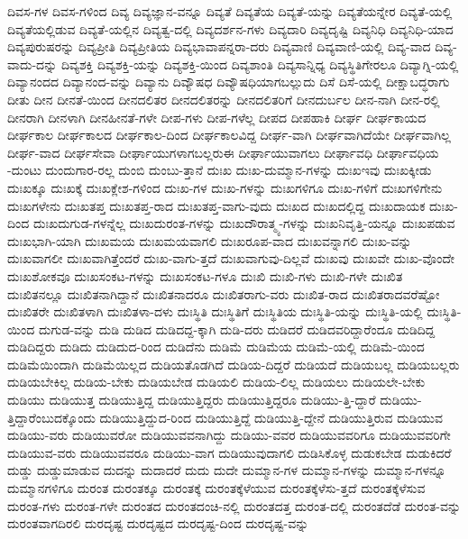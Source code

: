 {ದಿವಸ-ಗಳ
ದಿವಸ-ಗಳಿಂದ
ದಿವ್ಯ
ದಿವ್ಯಜ್ಞಾನ-ವನ್ನೂ
ದಿವ್ಯತೆ
ದಿವ್ಯತೆಯ
ದಿವ್ಯತೆ-ಯನ್ನು
ದಿವ್ಯತೆಯನ್ನೇರ
ದಿವ್ಯತೆ-ಯಲ್ಲಿ
ದಿವ್ಯತೆಯಲ್ಲಿಡುವ
ದಿವ್ಯತೆ-ಯಲ್ಲಿನ
ದಿವ್ಯತ್ವ-ದಲ್ಲಿ
ದಿವ್ಯದರ್ಶನ-ಗಳು
ದಿವ್ಯದಾರಿ
ದಿವ್ಯದೃಷ್ಟಿ
ದಿವ್ಯನಿಧಿ
ದಿವ್ಯನಿಧಿ-ಯಾದ
ದಿವ್ಯಪುರುಷರನ್ನು
ದಿವ್ಯಪ್ರೀತಿ
ದಿವ್ಯಪ್ರೀತಿಯ
ದಿವ್ಯಭಾವಾಪನ್ನರಾ-ದರು
ದಿವ್ಯವಾಣಿ
ದಿವ್ಯವಾಣಿ-ಯಲ್ಲಿ
ದಿವ್ಯ-ವಾದ
ದಿವ್ಯ-ವಾದು-ದನ್ನು
ದಿವ್ಯಶಕ್ತಿ
ದಿವ್ಯಶಕ್ತಿ-ಯನ್ನು
ದಿವ್ಯಶಕ್ತಿ-ಯಿಂದ
ದಿವ್ಯಶಾಂತಿ
ದಿವ್ಯಸಾನ್ನಿಧ್ಯ
ದಿವ್ಯಸ್ಥಿತಿಗೇರಲೂ
ದಿವ್ಯಾಗ್ನಿ-ಯಲ್ಲಿ
ದಿವ್ಯಾನಂದದ
ದಿವ್ಯಾನಂದ-ವನ್ನು
ದಿವ್ಯಾನು
ದಿವ್ಯೌಷಧ
ದಿವ್ಯೌಷಧಿಯಾಗಬಲ್ಲುದು
ದಿಸೆ
ದಿಸೆ-ಯಲ್ಲಿ
ದೀಕ್ಷಾಬದ್ಧರಾಗು
ದೀತು
ದೀನ
ದೀನತೆ-ಯಿಂದ
ದೀನದಲಿತರ
ದೀನದಲಿತರನ್ನು
ದೀನದಲಿತರಿಗೆ
ದೀನದುರ್ಬಲ
ದೀನ-ನಾಗಿ
ದೀನ-ರಲ್ಲಿ
ದೀನರಾಗಿ
ದೀನಳಾಗಿ
ದೀನಹೀನತೆ-ಗಳೇ
ದೀಪ-ಗಳು
ದೀಪ-ಗಳೆಲ್ಲ
ದೀಪದ
ದೀಪಹಾಕಿ
ದೀರ್ಘ
ದೀರ್ಘಕಾಯದ
ದೀರ್ಘಕಾಲ
ದೀರ್ಘಕಾಲದ
ದೀರ್ಘಕಾಲ-ದಿಂದ
ದೀರ್ಘಕಾಲವಿದ್ದ
ದೀರ್ಘ-ವಾಗಿ
ದೀರ್ಘವಾಗಿದೆಯೇ
ದೀರ್ಘವಾಗಿಲ್ಲ
ದೀರ್ಘ-ವಾದ
ದೀರ್ಘಸೇವಾ
ದೀರ್ಘಾಯುಗಳಾಗಬಲ್ಲರುಈ
ದೀರ್ಘಾಯುವಾಗಲು
ದೀರ್ಘಾವಧಿ
ದೀರ್ಘಾವಧಿಯ
-ದುಂಟು
ದುಂದುಗಾರ-ರಲ್ಲ
ದುಂಬಿ
ದುಂಬು-ತ್ತಾನೆ
ದುಃಖ
ದುಃಖ-ದುಮ್ಮಾನ-ಗಳನ್ನು
ದುಃಖಇವು
ದುಃಖಕ್ಕೀಡು
ದುಃಖಕ್ಕೂ
ದುಃಖಕ್ಕೆ
ದುಃಖಕ್ಲೇಶ-ಗಳಿಂದ
ದುಃಖ-ಗಳ
ದುಃಖ-ಗಳನ್ನು
ದುಃಖಗಳಿಗೂ
ದುಃಖ-ಗಳಿಗೆ
ದುಃಖಗಳಿಗೇನು
ದುಃಖಗಳೇನು
ದುಃಖತಪ್ತ
ದುಃಖತಪ್ತ-ರಾದ
ದುಃಖತಪ್ತ-ವಾಗು-ವುದು
ದುಃಖದ
ದುಃಖದಲ್ಲಿದ್ದ
ದುಃಖದಾಯಕ
ದುಃಖ-ದಿಂದ
ದುಃಖದುಗುಡ-ಗಳನ್ನೆಲ್ಲ
ದುಃಖದುರಂತ-ಗಳನ್ನು
ದುಃಖದೌರಾತ್ಮ್ಯ-ಗಳನ್ನು
ದುಃಖನಿವೃತ್ತಿ-ಯನ್ನೂ
ದುಃಖಪಡುವ
ದುಃಖಭಾಗಿ-ಯಾಗಿ
ದುಃಖಮಯ
ದುಃಖಮಯವಾಗಲಿ
ದುಃಖರೂಪ-ವಾದ
ದುಃಖವನ್ನಾಗಲಿ
ದುಃಖ-ವನ್ನು
ದುಃಖವಾಗಲೀ
ದುಃಖವಾಗಿತ್ತೆಂದರೆ
ದುಃಖ-ವಾಗು-ತ್ತದೆ
ದುಃಖವಾಗುವು-ದಿಲ್ಲವೆ
ದುಃಖವು
ದುಃಖವೇ
ದುಃಖ-ವೊಂದೇ
ದುಃಖಶೋಕವೂ
ದುಃಖಸಂಕಟ-ಗಳನ್ನು
ದುಃಖಸಂಕಟ-ಗಳೂ
ದುಃಖಿ
ದುಃಖಿ-ಗಳು
ದುಃಖಿ-ಗಳೇ
ದುಃಖಿತ
ದುಃಖಿತನಲ್ಲೂ
ದುಃಖಿತನಾಗಿದ್ದಾನೆ
ದುಃಖಿತನಾದರೂ
ದುಃಖಿತರಾಗು-ವರು
ದುಃಖಿತ-ರಾದ
ದುಃಖಿತರಾದವರೆಷ್ಟೋ
ದುಃಖಿತರೇ
ದುಃಖಿತಳಾಗಿ
ದುಃಖಿತಳಾ-ದಳು
ದುಃಸ್ಥಿತಿ
ದುಃಸ್ಥಿತಿಗೆ
ದುಃಸ್ಥಿತಿಯ
ದುಃಸ್ಥಿತಿ-ಯನ್ನು
ದುಃಸ್ಥಿತಿ-ಯಲ್ಲಿ
ದುಃಸ್ಥಿತಿ-ಯಿಂದ
ದುಗುಡ-ವನ್ನು
ದುಡಿ
ದುಡಿದ
ದುಡಿದದ್ದ-ಕ್ಕಾಗಿ
ದುಡಿ-ದರು
ದುಡಿದರೆ
ದುಡಿದವರಿದ್ದಾರೆಂದೂ
ದುಡಿದಿದ್ದ
ದುಡಿದಿದ್ದರು
ದುಡಿದು
ದುಡಿದುದ-ರಿಂದ
ದುಡಿದೆನು
ದುಡಿಮೆ
ದುಡಿಮೆಯ
ದುಡಿಮೆ-ಯಲ್ಲಿ
ದುಡಿಮೆ-ಯಿಂದ
ದುಡಿಮೆಯಿಂದಾಗಿ
ದುಡಿಮೆಯಿಲ್ಲದ
ದುಡಿಯತೊಡಗಿದೆ
ದುಡಿಯ-ದಿದ್ದರೆ
ದುಡಿಯದೆ
ದುಡಿಯಬಲ್ಲ
ದುಡಿಯಬಲ್ಲರು
ದುಡಿಯಬೇಕಿಲ್ಲ
ದುಡಿಯ-ಬೇಕು
ದುಡಿಯಬೇಡ
ದುಡಿಯಲಿ
ದುಡಿಯ-ಲಿಲ್ಲ
ದುಡಿಯಲು
ದುಡಿಯಲೇ-ಬೇಕು
ದುಡಿಯು
ದುಡಿಯುತ್ತ
ದುಡಿಯುತ್ತಿದ್ದ
ದುಡಿಯುತ್ತಿದ್ದರು
ದುಡಿಯುತ್ತಿದ್ದರೂ
ದುಡಿಯು-ತ್ತಿ-ದ್ದಾರೆ
ದುಡಿಯು-ತ್ತಿದ್ದಾರೆಂಬುದಕ್ಕೊಂದು
ದುಡಿಯುತ್ತಿದ್ದುದ-ರಿಂದ
ದುಡಿಯುತ್ತಿದ್ದೆ
ದುಡಿಯುತ್ತಿ-ದ್ದೇನೆ
ದುಡಿಯುತ್ತಿರುವ
ದುಡಿಯುವ
ದುಡಿಯು-ವರು
ದುಡಿಯುವರೋ
ದುಡಿಯುವವನಾಗಿದ್ದು
ದುಡಿಯು-ವವರ
ದುಡಿಯುವವರಿಗೂ
ದುಡಿಯುವವರಿಗೇ
ದುಡಿಯುವ-ವರು
ದುಡಿಯುವವರೂ
ದುಡಿಯು-ವಾಗ
ದುಡಿಯುವುದಾಗಲಿ
ದುಡಿಸಿಕೊಳ್ಳ
ದುಡುಕಬೇಡ
ದುಡುಕಿದರೆ
ದುಡ್ಡು
ದುಡ್ಡುಮಾಡುವ
ದುದನ್ನು
ದುದಾದರೆ
ದುದು
ದುದೇ
ದುಮ್ಮಾನ-ಗಳ
ದುಮ್ಮಾನ-ಗಳನ್ನು
ದುಮ್ಮಾನ-ಗಳನ್ನೂ
ದುಮ್ಮಾನಗಳಿಗೂ
ದುರಂತ
ದುರಂತಕ್ಕೂ
ದುರಂತಕ್ಕೆ
ದುರಂತಕ್ಕೆಳೆಯುವ
ದುರಂತಕ್ಕೆಳೆಸು-ತ್ತದೆ
ದುರಂತಕ್ಕೆಳೆಸುವ
ದುರಂತ-ಗಳು
ದುರಂತ-ಗಳೇ
ದುರಂತದ
ದುರಂತದಂಚಿ-ನಲ್ಲಿ
ದುರಂತದತ್ತ
ದುರಂತ-ದಲ್ಲಿ
ದುರಂತದೆಡೆ
ದುರಂತ-ವನ್ನು
ದುರಂತವಾಗದಿರಲಿ
ದುರದೃಷ್ಟ
ದುರದೃಷ್ಟದ
ದುರದೃಷ್ಟ-ದಿಂದ
ದುರದೃಷ್ಟ-ವನ್ನು
}
